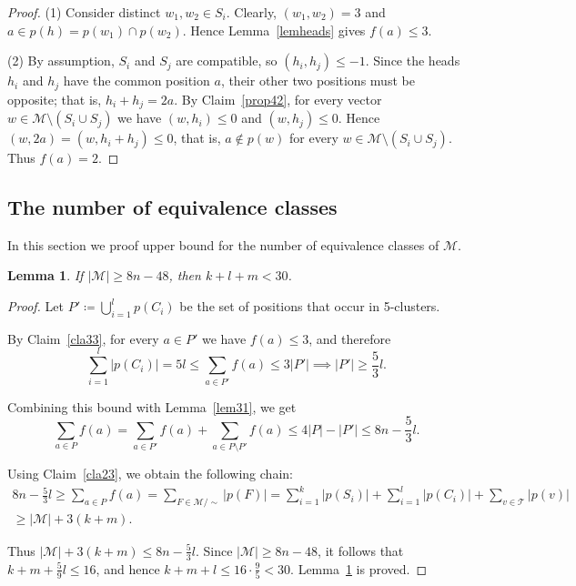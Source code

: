 \documentclass[12pt,a4paper]{article}
\newcommand{\M}{\mathcal{M}}
\newcommand{\T}{\mathcal{T}}
\newtheorem{lemma}[theorem]{Lemma}
\begin{document}
\begin{proof}
    (1) Consider distinct $w_1,w_2 \in S_i$. Clearly,
    $(w_1,w_2)=3$ and $a \in p(h)=p(w_1)\cap p(w_2)$. Hence Lemma~\ref{lemheads} gives $f(a) \leqslant 3$.

    (2) By assumption, $S_i$ and $S_j$ are compatible, so $(h_i,h_j) \leqslant -1$. Since the heads $h_i$ and $h_j$ have the common position $a$, their other two positions must be opposite; that is, $h_i+h_j=2a$. By Claim~\ref{prop42}, for every vector $w \in \M \setminus (S_i \cup S_j)$ we have $(w,h_i) \leqslant 0$ and $(w,h_j) \leqslant 0$. Hence $(w,2a)=(w,h_i+h_j) \leqslant 0$, that is, $a \notin p(w)$ for every $w \in \M \setminus (S_i \cup S_j)$. Thus $f(a)=2$.

\end{proof}

\subsection{The number of equivalence classes}

In this section we proof upper bound for the number of equivalence classes of $\M$.

\begin{lemma}\label{mainlem}
    If $|\M| \geqslant 8n-48$, then $k+l+m<30$.
\end{lemma}

\begin{proof}
    Let $P' \coloneqq \bigcup_{i=1}^l p(C_i)$ be the set of positions that occur in 5-clusters.

    By Claim~\ref{cla33}, for every $a \in P'$ we have $f(a) \leqslant 3$, and therefore
    \[
    \sum_{i=1}^l |p(C_i)| = 5l \leqslant \sum_{a\in P'} f(a) \leqslant 3|P'| \implies |P'| \geqslant \frac{5}{3}l.
    \]

    Combining this bound with Lemma~\ref{lem31}, we get
    \[
    \sum_{a \in P} f(a) = \sum_{a\in P'} f(a) + \sum_{a\in P \setminus P'} f(a)  \leqslant 4|P| - |P'| \leqslant 8n - \frac{5}{3}l.
    \]

    Using Claim~\ref{cla23}, we obtain the following chain:
    \begin{align*}
     8n - \frac{5}{3}l \geqslant    \sum_{a \in P} f(a) = \sum_{F \in \M/\sim} |p(F)| = \sum_{i=1}^k |p(S_i)| + \sum_{i=1}^l |p(C_i)| + \sum_{v \in \T} |p(v)| \\
    \geqslant  |\M| + 3(k+m).
    \end{align*}

    Thus $|\M|+3(k+m) \leqslant 8n-\frac{5}{3}l$. Since $|\M| \geqslant 8n-48$, it follows that $k+m+\frac{5}{9}l \leqslant 16$, and hence $k+m+l \leqslant 16 \cdot \frac{9}{5}<30$. Lemma~\ref{mainlem} is proved.
\end{proof}
\end{document}
